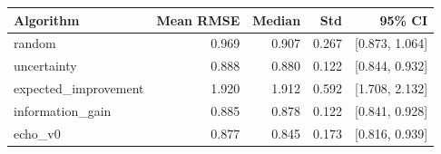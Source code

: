 \begin{tabular}{lrrrr}
\hline
Algorithm & Mean RMSE & Median & Std & 95\% CI \\
\hline
random & 0.969 & 0.907 & 0.267 & [0.873, 1.064] \\
uncertainty & 0.888 & 0.880 & 0.122 & [0.844, 0.932] \\
expected\_improvement & 1.920 & 1.912 & 0.592 & [1.708, 2.132] \\
information\_gain & 0.885 & 0.878 & 0.122 & [0.841, 0.928] \\
echo\_v0 & 0.877 & 0.845 & 0.173 & [0.816, 0.939] \\
\hline
\end{tabular}
